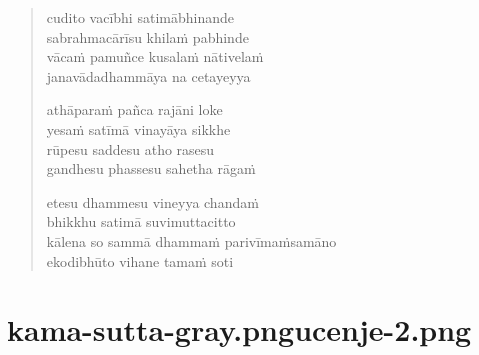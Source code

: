 \begin{verse}
cudito vacībhi satimābhinande\\
sabrahmacārīsu khilaṁ pabhinde\\
vācaṁ pamuñce kusalaṁ nātivelaṁ\\
janavādadhammāya na cetayeyya

athāparaṁ pañca rajāni loke\\
yesaṁ satīmā vinayāya sikkhe\\
rūpesu saddesu atho rasesu\\
gandhesu phassesu sahetha rāgaṁ

etesu dhammesu vineyya chandaṁ\\
bhikkhu satimā suvimuttacitto\\
kālena so sammā dhammaṁ parivīmaṁsamāno\\
ekodibhūto vihane tamaṁ soti

\end{verse}


\chapter[Sāriputta Sutta]{{kama-sutta-gray.png}{ucenje-2.png}}

